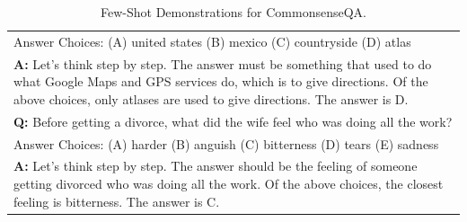 \documentclass[11pt]{article}
\begin{document}
\begin{table}[ht]
\begin{tabularx}{\textwidth}{X}
    Answer Choices: (A) united states (B) mexico (C) countryside (D) atlas \\
    \textbf{A: }Let's think step by step. The answer must be something that used to do what Google Maps and GPS services do, which is to give directions. Of the above choices, only atlases are used to give directions. The answer is D.\\
    \hdashline
    \textbf{Q: }Before getting a divorce, what did the wife feel who was doing all the work? \\
    Answer Choices: (A) harder (B) anguish (C) bitterness (D) tears (E) sadness \\
    \textbf{A: }Let's think step by step. The answer should be the feeling of someone getting divorced who was doing all the work. Of the above choices, the closest feeling is bitterness. The answer is C.\\
    \bottomrule
    \end{tabularx}
    \caption{Few-Shot Demonstrations for CommonsenseQA.}
    \label{tab:fs_csqa}
\end{table}
\end{document}
